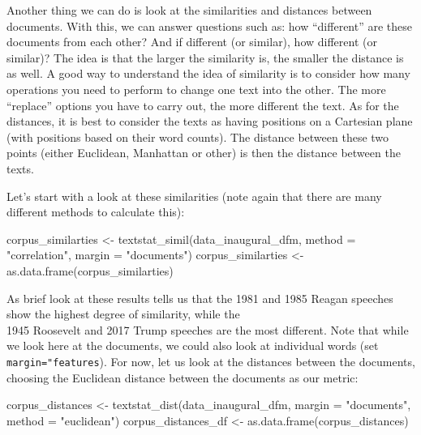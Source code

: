 \documentclass[
]{book}
\newenvironment{Shaded}{\begin{snugshade}}{\end{snugshade}}
\newcommand{\AttributeTok}[1]{\textcolor[rgb]{0.77,0.63,0.00}{#1}}
\newcommand{\FunctionTok}[1]{\textcolor[rgb]{0.00,0.00,0.00}{#1}}
\newcommand{\NormalTok}[1]{#1}
\newcommand{\OtherTok}[1]{\textcolor[rgb]{0.56,0.35,0.01}{#1}}
\newcommand{\StringTok}[1]{\textcolor[rgb]{0.31,0.60,0.02}{#1}}
\begin{document}
Another thing we can do is look at the similarities and distances between documents. With this, we can answer questions such as: how ``different'' are these documents from each other? And if different (or similar), how different (or similar)? The idea is that the larger the similarity is, the smaller the distance is as well. A good way to understand the idea of similarity is to consider how many operations you need to perform to change one text into the other. The more ``replace'' options you have to carry out, the more different the text. As for the distances, it is best to consider the texts as having positions on a Cartesian plane (with positions based on their word counts). The distance between these two points (either Euclidean, Manhattan or other) is then the distance between the texts.

Let's start with a look at these similarities (note again that there are many different methods to calculate this):

\begin{Shaded}
\begin{Highlighting}[]
\NormalTok{corpus\_similarties }\OtherTok{\textless{}{-}} \FunctionTok{textstat\_simil}\NormalTok{(data\_inaugural\_dfm, }\AttributeTok{method =} \StringTok{"correlation"}\NormalTok{, }\AttributeTok{margin =} \StringTok{"documents"}\NormalTok{)}
\NormalTok{corpus\_similarties }\OtherTok{\textless{}{-}} \FunctionTok{as.data.frame}\NormalTok{(corpus\_similarties)}
\end{Highlighting}
\end{Shaded}

As brief look at these results tells us that the 1981 and 1985 Reagan speeches show the highest degree of similarity, while the\\
1945 Roosevelt and 2017 Trump speeches are the most different. Note that while we look here at the documents, we could also look at individual words (set \texttt{margin="features}). For now, let us look at the distances between the documents, choosing the Euclidean distance between the documents as our metric:

\begin{Shaded}
\begin{Highlighting}[]
\NormalTok{corpus\_distances }\OtherTok{\textless{}{-}} \FunctionTok{textstat\_dist}\NormalTok{(data\_inaugural\_dfm, }\AttributeTok{margin =} \StringTok{"documents"}\NormalTok{, }\AttributeTok{method =} \StringTok{"euclidean"}\NormalTok{)}
\NormalTok{corpus\_distances\_df }\OtherTok{\textless{}{-}} \FunctionTok{as.data.frame}\NormalTok{(corpus\_distances)}
\end{Highlighting}
\end{Shaded}
\end{document}
